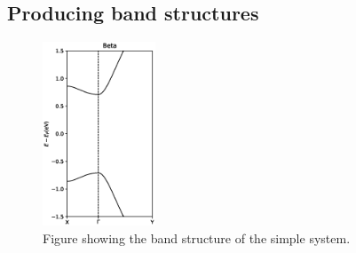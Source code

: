 \subsection{Producing band structures}
\begin{figure}
	\vspace{-2em}
	\includegraphics[width=0.30\textwidth]{Figures/BetaBandstructures.eps}
	\caption{Figure showing the band structure of the simple system.}\label{bandssimple}
\end{figure}
